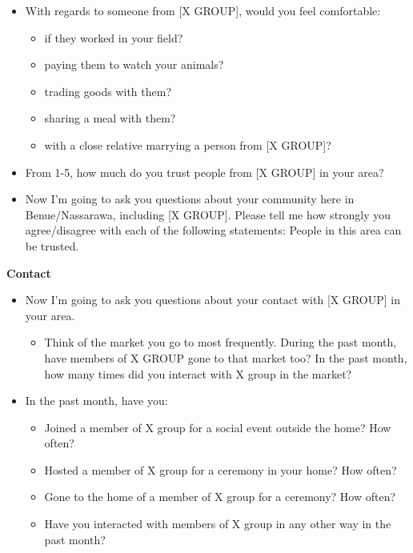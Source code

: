 \documentclass[
]{article}
\providecommand{\tightlist}{%
  \setlength{\itemsep}{0pt}\setlength{\parskip}{0pt}}
\begin{document}
\begin{itemize}
\tightlist
\item
  With regards to someone from {[}X GROUP{]}, would you feel
  comfortable:

  \begin{itemize}
  \tightlist
  \item
    if they worked in your field?
  \item
    paying them to watch your animals?
  \item
    trading goods with them?
  \item
    sharing a meal with them?
  \item
    with a close relative marrying a person from {[}X GROUP{]}?
  \end{itemize}
\item
  From 1-5, how much do you trust people from {[}X GROUP{]} in your
  area?
\item
  Now I'm going to ask you questions about your community here in
  Benue/Nassarawa, including {[}X GROUP{]}. Please tell me how strongly
  you agree/disagree with each of the following statements: People in
  this area can be trusted.
\end{itemize}

\textbf{Contact}

\begin{itemize}
\tightlist
\item
  Now I'm going to ask you questions about your contact with {[}X
  GROUP{]} in your area.

  \begin{itemize}
  \tightlist
  \item
    Think of the market you go to most frequently. During the past
    month, have members of X GROUP gone to that market too? In the past
    month, how many times did you interact with X group in the market?
  \end{itemize}
\item
  In the past month, have you:

  \begin{itemize}
  \tightlist
  \item
    Joined a member of X group for a social event outside the home? How
    often?
  \item
    Hosted a member of X group for a ceremony in your home? How often?
  \item
    Gone to the home of a member of X group for a ceremony? How often?
  \item
    Have you interacted with members of X group in any other way in the
    past month?
  \end{itemize}
\end{itemize}
\end{document}
